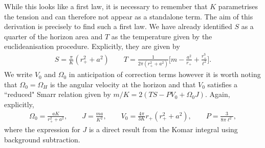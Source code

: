 \documentclass[
twoside,openright,frontopenright]{dmathesis}
\begin{document}
While this looks like a first law, it is necessary to remember that $K$
parametrises the tension and can therefore not appear as a standalone term. The
aim of this derivation is precisely to find such a first law. 
We have already identified $S$ as a quarter of the horizon area and $T$ as the
temperature given by the euclideanisation procedure. Explicitly, they are given
by 
\begin{align} \label{eq:SandT-al}
S = \frac{\pi}{K}(r_+^2+a^2) \qquad
  T=\frac{1}{2\pi(r_{+}^{2}+a^{2})}
  \bigg[m-\frac{a^{2}}{r_{+}}+\frac{r_{+}^{3}}{\ell^{2}}\bigg].  
\end{align}
We write $V_0$ and $\Omega_0$ in anticipation of correction terms however it is
worth noting that $\Omega_0=\Omega_H$ is the angular velocity at the horizon and
that $V_0$ satisfies a ``reduced" Smarr relation given by $m/K =
2(TS-PV_0+\Omega_0 J)$. Again, explicitly, 
\begin{align} \label{eq:horpotentials-al}
\Omega_0 =  \frac{a K}{r_{+}^{2}+a^{2}}, \qquad J=\frac{ma}{K^2}, \qquad V_0 =
  \frac{4\pi}{3K}r_+(r_+^2+a^2), \qquad P = \frac{3}{8\pi\ell^2}, 
\end{align}
where the expression for $J$ is a direct result from the Komar integral using
background subtraction. 
\end{document}
